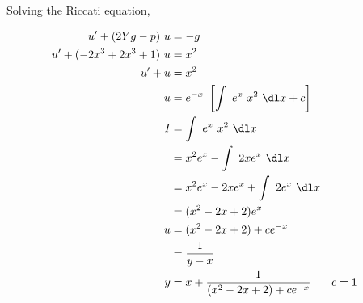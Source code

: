\begin{enumerate}
\begin{enumerate}
                    Solving the Riccati equation,

                    \begin{align}
                        u' + (2Yg - p)\ u & = -g                                  \\
                        u' + (-2x^{3} + 2x^{3} + 1)\ u
                                          & = x^{2}                               \\
                        u' + u            & = x^{2}                               \\
                        u                 & = e^{-x}\ \left[ \int\ e^{x}\ x^{2}
                        \ \dl x + c \right]                                       \\
                        I                 & = \int\ e^{x}\ x^{2}\ \dl x           \\
                                          & = x^{2}e^{x} - \int\ 2x e^{x}\ \dl x  \\
                                          & = x^{2}e^{x} - 2xe^{x} + \int\ 2e^{x}
                        \ \dl x                                                   \\
                                          & = (x^{2} - 2x + 2)e^{x}               \\
                        u                 & = (x^{2} - 2x + 2) + ce^{-x}          \\
                                          & = \frac{1}{y - x}                     \\
                        y                 & = x + \frac{1}{(x^{2} - 2x + 2)
                        + ce^{-x}}        &
                        c                 & = 1
                    \end{align}



\end{enumerate}
\end{enumerate}
